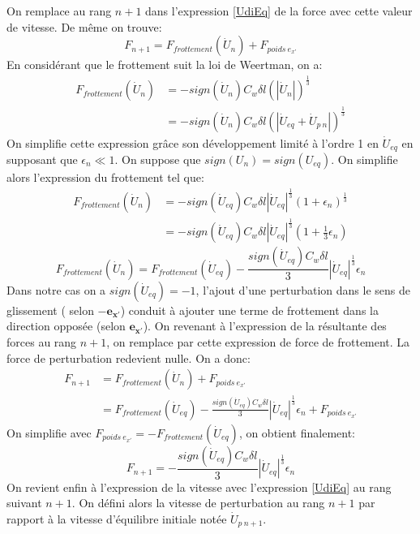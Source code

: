 \documentclass[11pt, a4paper]{article}
\begin{document}
On remplace au rang $n+1$ dans l'expression \ref{UdiEq} de la force avec cette valeur de vitesse. De même on trouve:
$$ F_{n+1} = F_{frottement}(\dot{U}_{n}) + F_{poids \ e_{x'}}$$
En considérant que le frottement suit la loi de Weertman, on a: 
\begin{align*}
F_{frottement}(\dot{U}_{n}) &= - sign(\dot{U}_n) C_w \delta l ( | \dot{U}_{n} | )^{\frac{1}{3}} \\
\quad &= - sign(\dot{U}_n) C_w \delta l ( | \dot{U}_{eq} + \dot{U}_{p \ n} | )^{\frac{1}{3}}
\end{align*}
On simplifie cette expression grâce son développement limité à l'ordre 1 en $\dot{U}_{eq}$ en supposant que $\epsilon_n \ll 1$. On suppose que $sign(U_n) = sign(U_{eq}) $. On simplifie alors l'expression du frottement tel que:
\begin{align*}
F_{frottement}(\dot{U}_{n}) &= - sign(\dot{U}_{eq}) C_w \delta l | \dot{U}_{eq} |^{\frac{1}{3}} \left( 1 + \epsilon_n \right)^{\frac{1}{3}} \\
\quad &= - sign(\dot{U}_{eq}) C_w \delta l | \dot{U}_{eq} |^{\frac{1}{3}} \left( 1 + \frac{1}{3} \epsilon_n \right)
\end{align*}
\begin{equation}
F_{frottement}(\dot{U}_n) = F_{frottement}(\dot{U}_{eq}) - \frac{ sign(\dot{U}_{eq}) C_w \delta l}{3} | \dot{U}_{eq}|^{\frac{1}{3}}\epsilon_n
\end{equation}
Dans notre cas on a $sign(\dot{U}_{eq})=-1$, l'ajout d'une perturbation dans le sens de glissement ( selon $- \mathbf{e_{x'}}$) conduit à ajouter une terme de frottement dans la direction opposée (selon $\mathbf{e_{x'}}$). On revenant à l'expression de la résultante des forces au rang $n+1$, on remplace par cette expression de force de frottement. La force de perturbation redevient nulle. On a donc:
\begin{align*}
F_{n+1} &= F_{frottement}(\dot{U}_{n}) + F_{poids \ e_{x'}} \\
\quad &= F_{frottement}(\dot{U}_{eq}) - \frac{ sign(\dot{U}_{eq}) C_w \delta l}{3} | \dot{U}_{eq}|^{\frac{1}{3}}\epsilon_n + F_{poids \ e_{x'}}
\end{align*}
On simplifie avec $F_{poids \ e_{x'}} = - F_{frottement}(\dot{U}_{eq})$, on obtient finalement:
\begin{equation}
F_{n+1}= - \frac{ sign(\dot{U}_{eq}) C_w \delta l}{3} | \dot{U}_{eq}|^{\frac{1}{3}}\epsilon_n \label{Fn1Eq}
\end{equation}
On revient enfin à l'expression de la vitesse avec l'expression \ref{UdiEq} au rang suivant $n+1$. On défini alors la vitesse de perturbation au rang $n+1$ par rapport à la vitesse d'équilibre initiale notée $\dot{U}_{p \ n+1}$.
\end{document}
